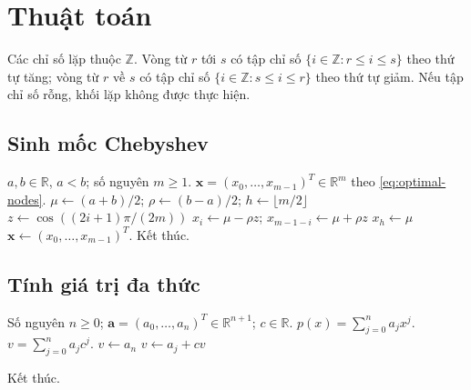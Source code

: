 \documentclass[12pt,a4paper,oneside]{book}
\numberwithin{algorithm}{chapter}
\theoremstyle{definition}
\newcommand{\R}{\mathbb{R}}
\begin{document}

\appendix
\chapter{Thuật toán}
\label{app:algorithms}
Các chỉ số lặp thuộc $\mathbb Z$. Vòng từ $r$ tới $s$ có tập chỉ số $\{i\in\mathbb Z:r\leq i\leq s\}$ theo thứ tự tăng; vòng từ $r$ về $s$ có tập chỉ số $\{i\in\mathbb Z:s\leq i\leq r\}$ theo thứ tự giảm. Nếu tập chỉ số rỗng, khối lặp không được thực hiện.

\section{Sinh mốc Chebyshev}
\begin{algorithm}[H]
\caption{Sinh mốc Chebyshev}
\label{alg:chebyshev-nodes}
\begin{algorithmic}[1]
\Require $a,b\in\R$, $a<b$; số nguyên $m\geq1$.
\Ensure $\boldsymbol x=(x_0,\ldots,x_{m-1})^T\in\R^m$ theo \eqref{eq:optimal-nodes}.
\State $\mu\gets(a+b)/2$; $\rho\gets(b-a)/2$; $h\gets\lfloor m/2\rfloor$
  \State $z\gets\cos((2i+1)\pi/(2m))$
  \State $x_i\gets\mu-\rho z$; $x_{m-1-i}\gets\mu+\rho z$
\EndFor
\Statex
{}
  \State $x_h\gets\mu$
\EndIf
\Statex
\State $\boldsymbol x\gets(x_0,\ldots,x_{m-1})^T$.
\State Kết thúc.
\end{algorithmic}
\end{algorithm}

\section{Tính giá trị đa thức}
\begin{algorithm}[H]
\caption{Tính giá trị đa thức bằng Horner}
\label{alg:horner-eval}
\begin{algorithmic}[1]
\Require Số nguyên $n\geq0$; $\boldsymbol a=(a_0,\ldots,a_n)^T\in\R^{n+1}$; $c\in\R$. $p(x)=\sum_{j=0}^{n}a_jx^j$.
\Ensure $v=\sum_{j=0}^{n}a_jc^j$.
\State $v\gets a_n$
  \State $v\gets a_j+cv$
\EndFor
\Statex

\State Kết thúc.
\end{algorithmic}
\end{algorithm}

\end{document}
